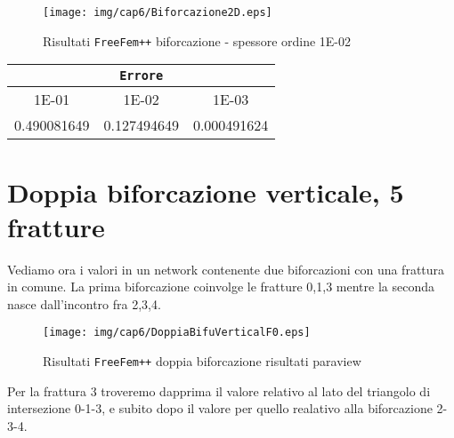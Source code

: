 \begin{figure}[h!]
\centering
\texttt{[image: img/cap6/Biforcazione2D.eps]}
\caption{Risultati \texttt{FreeFem++} biforcazione - spessore ordine 1E-02 }\label{Biforcazione1E-02}
\end{figure}

\begin{center}
\begin{tabular}{|c|c|c|}
\hline
  \multicolumn{3}{|c|}{\textbf{\texttt{Errore}}} \\ 
\hline
\multicolumn{1}{|c|}{1E-01} & 1E-02 & 1E-03 \\
\hline
 0.490081649 & 0.127494649 & 0.000491624 \\
\hline
\end{tabular}
\end{center}

\section{Doppia biforcazione verticale, 5 fratture}
Vediamo ora i valori in un network contenente due biforcazioni con una frattura in comune.
La prima biforcazione coinvolge le fratture 0,1,3 mentre la seconda nasce dall'incontro fra 2,3,4.\\

\begin{figure}[h!]
\centering
\texttt{[image: img/cap6/DoppiaBifuVerticalF0.eps]}
\caption{Risultati \texttt{FreeFem++} doppia biforcazione risultati paraview }\label{DoppiaBifuVerticalParaview}
\end{figure}

Per la frattura 3 troveremo dapprima il valore relativo al lato del triangolo di intersezione 0-1-3, e subito dopo il valore per quello realativo alla biforcazione 2-3-4.


